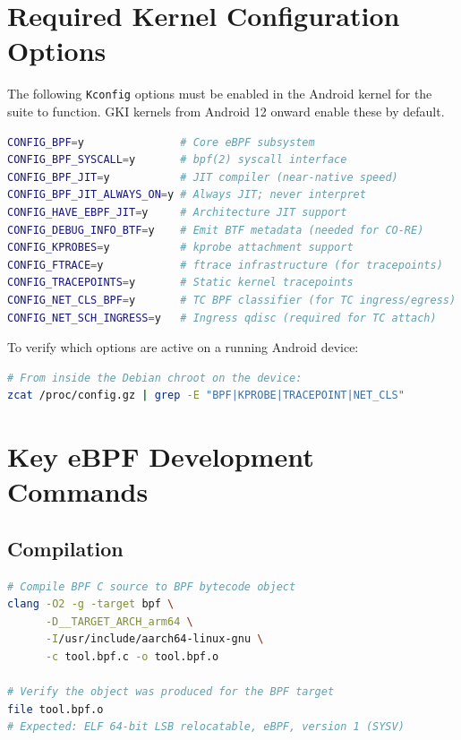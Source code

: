 \documentclass{mnitjaipur}
\begin{document}
\section{Required Kernel Configuration Options}

The following \texttt{Kconfig} options must be enabled in the Android kernel for the suite to function. GKI kernels from Android 12 onward enable these by default.

\begin{lstlisting}[language=bash]
CONFIG_BPF=y               # Core eBPF subsystem
CONFIG_BPF_SYSCALL=y       # bpf(2) syscall interface
CONFIG_BPF_JIT=y           # JIT compiler (near-native speed)
CONFIG_BPF_JIT_ALWAYS_ON=y # Always JIT; never interpret
CONFIG_HAVE_EBPF_JIT=y     # Architecture JIT support
CONFIG_DEBUG_INFO_BTF=y    # Emit BTF metadata (needed for CO-RE)
CONFIG_KPROBES=y           # kprobe attachment support
CONFIG_FTRACE=y            # ftrace infrastructure (for tracepoints)
CONFIG_TRACEPOINTS=y       # Static kernel tracepoints
CONFIG_NET_CLS_BPF=y       # TC BPF classifier (for TC ingress/egress)
CONFIG_NET_SCH_INGRESS=y   # Ingress qdisc (required for TC attach)
\end{lstlisting}

To verify which options are active on a running Android device:
\begin{lstlisting}[language=bash]
# From inside the Debian chroot on the device:
zcat /proc/config.gz | grep -E "BPF|KPROBE|TRACEPOINT|NET_CLS"
\end{lstlisting}

\section{Key eBPF Development Commands}

\subsection{Compilation}

\begin{lstlisting}[language=bash]
# Compile BPF C source to BPF bytecode object
clang -O2 -g -target bpf \
      -D__TARGET_ARCH_arm64 \
      -I/usr/include/aarch64-linux-gnu \
      -c tool.bpf.c -o tool.bpf.o

# Verify the object was produced for the BPF target
file tool.bpf.o
# Expected: ELF 64-bit LSB relocatable, eBPF, version 1 (SYSV)
\end{lstlisting}
\end{document}
